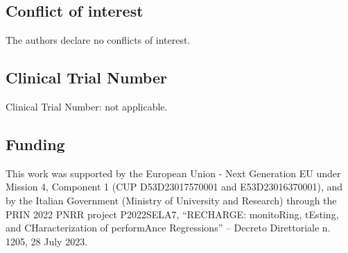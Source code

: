 \subsection{Conflict of interest}
The authors declare no conflicts of interest.

\subsection{Clinical Trial Number}
Clinical Trial Number: not applicable.

\subsection{Funding}
This work was supported by the European Union - Next Generation EU under Mission 4, Component 1 (CUP D53D23017570001 and E53D23016370001), and by the Italian Government (Ministry of University and Research) through the PRIN 2022 PNRR project P2022SELA7, ``RECHARGE: monitoRing, tEsting, and CHaracterization of performAnce Regressions'' --  Decreto Direttoriale n. 1205, 28 July 2023.





